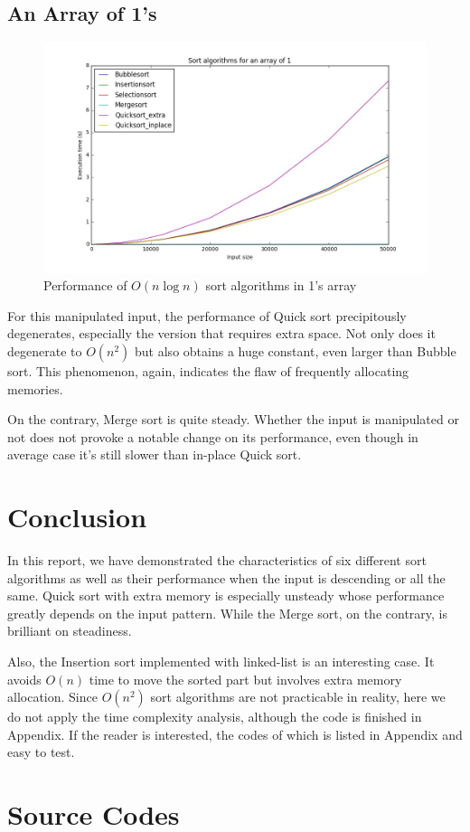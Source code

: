 \subsection{An Array of 1's}
\begin{figure}[H]
    \centering
    \includegraphics[width=0.8\linewidth]{../a1/same}
    \caption{Performance of $O(n\log n)$ sort algorithms in 1's array}\label{s}
\end{figure}
For this manipulated input, the performance of Quick sort precipitously degenerates, especially the version that requires extra space. Not only does it degenerate to $O(n^2)$ but also obtains a huge constant, even larger than Bubble sort. This phenomenon, again, indicates the flaw of frequently allocating memories.

On the contrary, Merge sort is quite steady. Whether the input is manipulated or not does not provoke a notable change on its performance, even though in average case it's still slower than in-place Quick sort.

\section{Conclusion}
In this report, we have demonstrated the characteristics of six different sort algorithms as well as their performance when the input is descending or all the same. Quick sort with extra memory is especially unsteady whose performance greatly depends on the input pattern. While the Merge sort, on the contrary, is brilliant on steadiness.

Also, the Insertion sort implemented with linked-list is an interesting case. It avoids $O(n)$ time to move the sorted part but involves extra memory allocation. Since $O(n^2)$ sort algorithms are not practicable in reality, here we do not apply the time complexity analysis, although the code is finished in Appendix. If the reader is interested, the codes of which is listed in Appendix and easy to test.

\clearpage
\appendix
\section{Source Codes}
